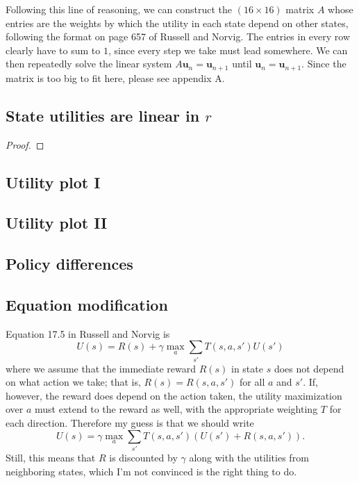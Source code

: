 \documentclass[letterpaper, 10pt]{article}
\begin{document}
\begin{multicols}{2}
Following this line of reasoning, we can construct the $(16 \times 16)$ matrix $A$ whose entries are the weights by which the utility in each state depend on other states, following the format on page 657 of Russell and Norvig.
The entries in every row clearly have to sum to $1$, since every step we take must lead somewhere. 
We can then repeatedly solve the linear system $A \mathbf{u}_n = \mathbf{u}_{n+1}$ until $\mathbf{u}_n = \mathbf{u}_{n+1}$. 
Since the matrix is too big to fit here, please see appendix A. 


\subsection{State utilities are linear in $r$}
\begin{proof}

\end{proof}

\subsection{Utility plot I}

\subsection{Utility plot II}

\subsection{Policy differences}

\subsection{Equation modification}
Equation 17.5 in Russell and Norvig is 
\[ U(s) = R(s) + \gamma \max_a \sum_{s'} T(s, a, s') U(s') \]
where we assume that the immediate reward $R(s)$ in state $s$ does not depend on what action we take; that is, $R(s) = R(s, a, s')$ for all $a$ and $s'$. 
If, however, the reward does depend on the action taken, the utility maximization over $a$ must extend to the reward as well, with the appropriate weighting $T$ for each direction. 
Therefore my guess is that we should write 
\[  U(s) = \gamma \max_a \sum_{s'} T(s, a, s') \left( U(s') + R(s, a, s') \right). \]
Still, this means that $R$ is discounted by $\gamma$ along with the utilities from neighboring states, which I'm not convinced is the right thing to do. 


\end{multicols}
\end{document}
